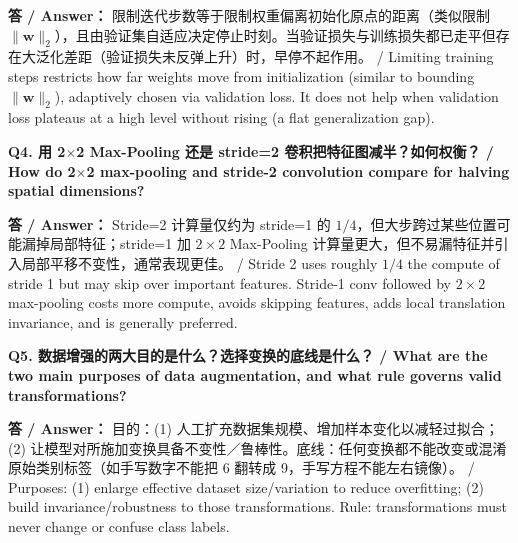 \textbf{答 / Answer：} 限制迭代步数等于限制权重偏离初始化原点的距离（类似限制 $\|\mathbf{w}\|_2$），且由验证集自适应决定停止时刻。当验证损失与训练损失都已走平但存在大泛化差距（验证损失未反弹上升）时，早停不起作用。 / Limiting training steps restricts how far weights move from initialization (similar to bounding $\|\mathbf{w}\|_2$), adaptively chosen via validation loss. It does not help when validation loss plateaus at a high level without rising (a flat generalization gap).

\textbf{Q4. 用 2\ensuremath{\times}2 Max-Pooling 还是 stride=2 卷积把特征图减半？如何权衡？ / How do 2\ensuremath{\times}2 max-pooling and stride-2 convolution compare for halving spatial dimensions?}

\textbf{答 / Answer：} Stride=2 计算量仅约为 stride=1 的 $1/4$，但大步跨过某些位置可能漏掉局部特征；stride=1 加 $2\times 2$ Max-Pooling 计算量更大，但不易漏特征并引入局部平移不变性，通常表现更佳。 / Stride 2 uses roughly $1/4$ the compute of stride 1 but may skip over important features. Stride-1 conv followed by $2\times 2$ max-pooling costs more compute, avoids skipping features, adds local translation invariance, and is generally preferred.

\textbf{Q5. 数据增强的两大目的是什么？选择变换的底线是什么？ / What are the two main purposes of data augmentation, and what rule governs valid transformations?}

\textbf{答 / Answer：} 目的：(1) 人工扩充数据集规模、增加样本变化以减轻过拟合；(2) 让模型对所施加变换具备不变性／鲁棒性。底线：任何变换都不能改变或混淆原始类别标签（如手写数字不能把 6 翻转成 9，手写方程不能左右镜像）。 / Purposes: (1) enlarge effective dataset size/variation to reduce overfitting; (2) build invariance/robustness to those transformations. Rule: transformations must never change or confuse class labels.




